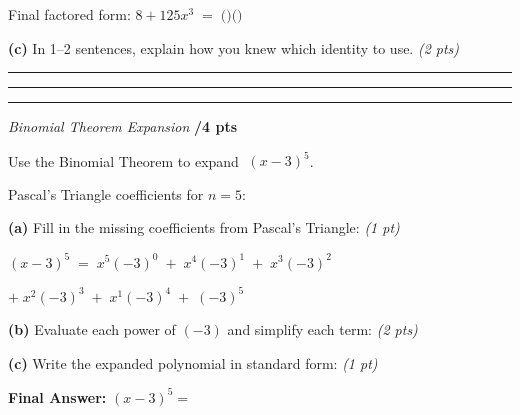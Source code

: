 \documentclass[11pt]{article}
\newcommand{\blank}[1][2cm]{\underline{\hspace{#1}}}
\newcommand{\writeline}{\vspace{2pt}\noindent\rule{\linewidth}{0.3pt}\vspace{6pt}}
\begin{document}
\vspace{24pt}

\noindent Final factored form: \quad $8 + 125x^3 \;=\; \bigl($\blank[2cm]$\bigr)\bigl($\blank[3.5cm]$\bigr)$

\vspace{10pt}
\noindent\textbf{(c)} In 1--2 sentences, explain how you knew which identity to use. \hfill \textit{(2 pts)}

\vspace{2pt}
\writeline
\writeline

\vspace{2pt}
\noindent\rule{\linewidth}{1.5pt}
\vspace{6pt}

 {\itshape Binomial Theorem Expansion} \hfill \textbf{/4 pts}

\vspace{6pt}
\noindent Use the Binomial Theorem to expand $\;(x - 3)^5$.

\vspace{4pt}
\begin{tcolorbox}[wordbank]
Pascal's Triangle coefficients for $n = 5$:      
\end{tcolorbox}

\vspace{6pt}
\noindent\textbf{(a)} Fill in the missing coefficients from Pascal's Triangle: \hfill \textit{(1 pt)}

\vspace{4pt}
\noindent\hspace{6pt}$\displaystyle(x-3)^5 \;=\; $\blank[0.6cm]$x^5(-3)^0 \;+\;$\blank[0.6cm]$x^4(-3)^1 \;+\;$\blank[0.6cm]$x^3(-3)^2$

\vspace{6pt}
\noindent\hspace{62pt}$+\;$\blank[0.6cm]$x^2(-3)^3 \;+\;$\blank[0.6cm]$x^1(-3)^4 \;+\;$\blank[0.6cm]$(-3)^5$

\vspace{10pt}
\noindent\textbf{(b)} Evaluate each power of $(-3)$ and simplify each term: \hfill \textit{(2 pts)}

\vspace{24pt}

\noindent\textbf{(c)} Write the expanded polynomial in standard form: \hfill \textit{(1 pt)}

\vspace{4pt}
\begin{tcolorbox}[answerbox]
\textbf{Final Answer:} \quad $(x - 3)^5 = $ \blank[10cm]
\end{tcolorbox}
\end{document}
